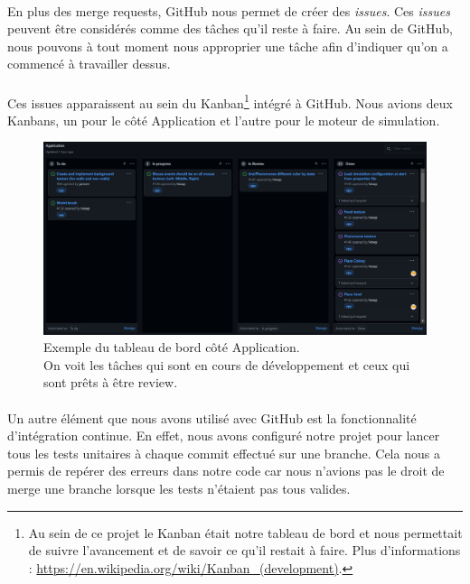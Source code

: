 \documentclass{EPUProjetDi}
\begin{document}
\paragraph{}
En plus des merge requests, GitHub nous permet de créer des \textit{issues}.
Ces \textit{issues} peuvent être considérés comme des tâches qu'il reste à faire. Au sein de GitHub, nous
pouvons à tout moment nous approprier une tâche afin d'indiquer qu'on a commencé à travailler dessus.

\paragraph{}
Ces issues apparaissent au sein du Kanban\footnote{Au sein de ce projet le Kanban était notre tableau de bord et nous permettait de suivre 
l'avancement et de savoir ce qu'il restait à faire. Plus d'informations : \url{https://en.wikipedia.org/wiki/Kanban_(development)}.}
intégré à GitHub. Nous avions deux Kanbans, un pour le côté Application et l'autre pour le moteur de simulation.

\begin{figure}[h]
\centering
\includegraphics[scale=.4]{Kanban.png}
\caption{Exemple du tableau de bord côté Application. 
\\On voit les tâches qui sont en cours de développement et ceux qui sont prêts à être review.}
\label{fig:Kanban}
\end{figure}

\paragraph{}
Un autre élément que nous avons utilisé avec GitHub est la fonctionnalité d'intégration continue. En effet, nous avons configuré notre projet 
pour lancer tous les tests unitaires à chaque commit effectué sur une branche.
Cela nous a permis de repérer des erreurs dans notre code car nous n'avions pas le droit de merge une branche lorsque les tests n'étaient pas tous valides.
\end{document}
